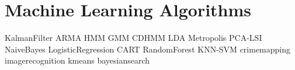 \documentclass[opener-c,labs,yellow,nociteref]{HJnewsiambook}
\begin{document}
\part{Machine Learning Algorithms} %
{KalmanFilter}
{ARMA}
{HMM}
{GMM}
{CDHMM}
{LDA}
{Metropolis}
{PCA-LSI}
{NaiveBayes}
{LogisticRegression}
{CART}
{RandomForest}
{KNN-SVM}
{crimemapping}
{imagerecognition}
{kmeans}
{bayesiansearch}
\end{document}
